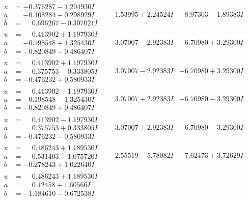 \documentclass[1p]{elsarticle_modified}
\theoremstyle{definition}
\begin{document}
$$\begin{array}{c|c|c}
\begin{aligned}
u &= -0.376287 - 1.204930 I \\
a &= -0.408284 - 0.298929 I \\
b &= \phantom{-}0.696267 - 0.307021 I\end{aligned}
 & \phantom{-}1.53995 + 2.24524 I & -8.97303 - 1.89383 I \\ \hline\begin{aligned}
u &= \phantom{-}0.413902 + 1.197930 I \\
a &= -0.198548 + 1.325430 I \\
b &= -0.820849 - 0.486407 I\end{aligned}
 & \phantom{-}3.07007 - 2.92383 I & -6.70980 + 3.29300 I \\ \hline\begin{aligned}
u &= \phantom{-}0.413902 + 1.197930 I \\
a &= \phantom{-}0.375753 - 0.333805 I \\
b &= -0.476232 + 0.580933 I\end{aligned}
 & \phantom{-}3.07007 - 2.92383 I & -6.70980 + 3.29300 I \\ \hline\begin{aligned}
u &= \phantom{-}0.413902 - 1.197930 I \\
a &= -0.198548 - 1.325430 I \\
b &= -0.820849 + 0.486407 I\end{aligned}
 & \phantom{-}3.07007 + 2.92383 I & -6.70980 - 3.29300 I \\ \hline\begin{aligned}
u &= \phantom{-}0.413902 - 1.197930 I \\
a &= \phantom{-}0.375753 + 0.333805 I \\
b &= -0.476232 - 0.580933 I\end{aligned}
 & \phantom{-}3.07007 + 2.92383 I & -6.70980 - 3.29300 I \\ \hline\begin{aligned}
u &= \phantom{-}0.486243 + 1.189530 I \\
a &= \phantom{-}0.531403 - 1.075720 I \\
b &= -0.278243 + 1.022640 I\end{aligned}
 & \phantom{-}2.55519 - 5.78082 I & -7.62473 + 3.72629 I \\ \hline\begin{aligned}
u &= \phantom{-}0.486243 + 1.189530 I \\
a &= \phantom{-}0.12458 + 1.60566 I \\
b &= -1.184610 - 0.672538 I\end{aligned}

\end{array}$$
\end{document}
